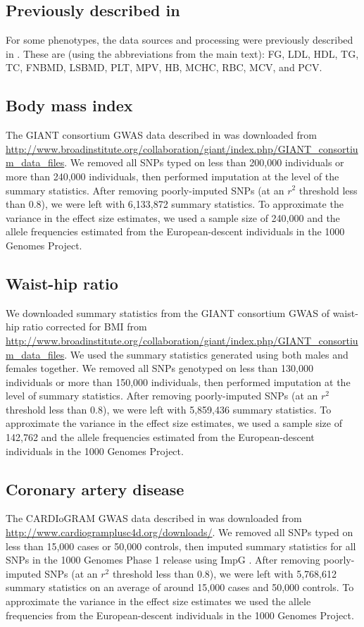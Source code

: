 \documentclass[11pt,titlepage]{article}
\begin{document}
\subsection{Previously described in \citet{pickrell2013joint}}
For some phenotypes, the data sources and processing were previously described in \citet{pickrell2013joint}. These are (using the abbreviations from the main text): FG, LDL, HDL, TG, TC,  FNBMD, LSBMD, PLT, MPV, HB, MCHC, RBC, MCV, and PCV. \subsection{Body mass index}
The GIANT consortium GWAS data described in \citet{Locke:2015aa} was downloaded from \url{http://www.broadinstitute.org/collaboration/giant/index.php/GIANT_consortium_data_files}. We removed all SNPs typed on less than 200,000 individuals or more than 240,000 individuals, then performed imputation at the level of the summary statistics. After removing poorly-imputed SNPs (at an $r^2$ threshold less than 0.8), we were left with 6,133,872 summary statistics. To approximate the variance in the effect size estimates, we used a sample size of 240,000 and the allele frequencies estimated from the European-descent individuals in the 1000 Genomes Project. 
\subsection{Waist-hip ratio}
We downloaded summary statistics from the GIANT consortium GWAS of waist-hip ratio corrected for BMI  \citep{Shungin:2015aa} from \url{http://www.broadinstitute.org/collaboration/giant/index.php/GIANT_consortium_data_files}. We used the summary statistics generated using both males and females together. We removed all SNPs genotyped on less than 130,000 individuals or more than 150,000 individuals, then performed imputation at the level of summary statistics.  After removing poorly-imputed SNPs (at an $r^2$ threshold less than 0.8), we were left with 5,859,436 summary statistics. To approximate the variance in the effect size estimates, we used a sample size of 142,762 and the allele frequencies estimated from the European-descent individuals in the 1000 Genomes Project. 

\subsection{Coronary artery disease}
The CARDIoGRAM GWAS data described in \citet{Schunkert:2011aa} was downloaded from \url{http://www.cardiogramplusc4d.org/downloads/}. We removed all SNPs typed on less than  15,000 cases or 50,000 controls, then imputed summary statistics for all SNPs in the 1000 Genomes Phase 1 release using ImpG \citep{pasaniuc2013fast}. After removing poorly-imputed SNPs (at an $r^2$ threshold less than 0.8), we were left with 5,768,612 summary statistics on an average of around 15,000 cases and 50,000 controls. To approximate the variance in the effect size estimates we used the allele frequencies from the European-descent individuals in the 1000 Genomes Project. 
\end{document}
